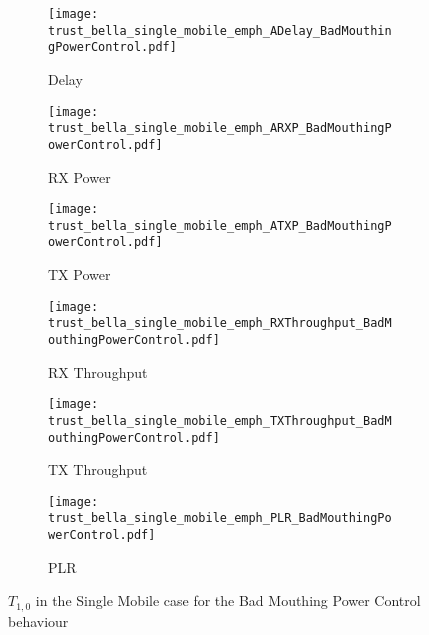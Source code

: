 \documentclass[runningheads,a4paper]{llncs}
\begin{document}
\begin{figure}
\begin{subfigure}{0.32\textwidth}
  \centering
  \texttt{[image: trust\_bella\_single\_mobile\_emph\_ADelay\_BadMouthingPowerControl.pdf]}
  \caption{Delay}
  \label{fig:single_mobile_badmouthing_delay}
\end{subfigure}
\begin{subfigure}{0.32\textwidth}
\centering
  \texttt{[image: trust\_bella\_single\_mobile\_emph\_ARXP\_BadMouthingPowerControl.pdf]}
  \caption{RX Power}
  \label{fig:single_mobile_badmouthing_rxp}
\end{subfigure}
\begin{subfigure}{0.32\textwidth}
\centering
  \texttt{[image: trust\_bella\_single\_mobile\_emph\_ATXP\_BadMouthingPowerControl.pdf]}
  \caption{TX Power}
  \label{fig:single_mobile_badmouthing_txp}
\end{subfigure}
\begin{subfigure}{0.32\textwidth}
\centering
  \texttt{[image: trust\_bella\_single\_mobile\_emph\_RXThroughput\_BadMouthingPowerControl.pdf]}
  \caption{RX Throughput}
  \label{fig:single_mobile_badmouthing_rxthroughput}
\end{subfigure}
\begin{subfigure}{0.32\textwidth}
\centering
  \texttt{[image: trust\_bella\_single\_mobile\_emph\_TXThroughput\_BadMouthingPowerControl.pdf]}
  \caption{TX Throughput}
  \label{fig:single_mobile_badmouthing_txthroughput}
\end{subfigure}
\begin{subfigure}{0.32\textwidth}
\centering
  \texttt{[image: trust\_bella\_single\_mobile\_emph\_PLR\_BadMouthingPowerControl.pdf]}
  \caption{PLR}
  \label{fig:single_mobile_badmouthing_plr}
\end{subfigure}
\caption{$T_{1,0}$ in the Single Mobile case for the Bad Mouthing Power Control behaviour}
\label{fig:single_mobile_badmouthing}
\end{figure}
\end{document}
